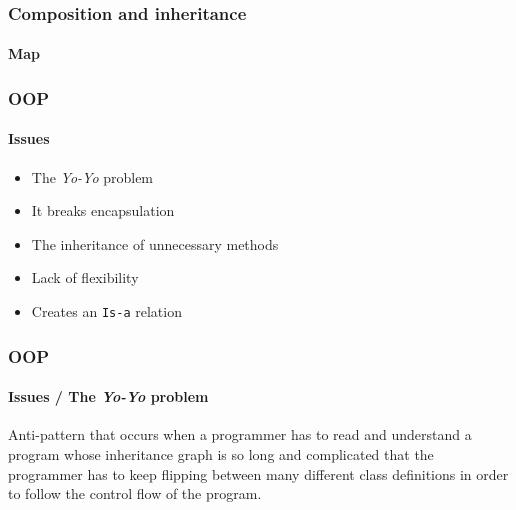 \begin{frame}[fragile,c]
    \frametitle{Composition and inheritance}
    \framesubtitle{Map}

\end{frame}

\begin{frame}
    \frametitle{OOP}
    \framesubtitle{Issues}

    \begin{itemize}[<+->]
        \item The \textit{Yo-Yo} problem
        \item It breaks encapsulation
        \item The inheritance of unnecessary methods
        \item Lack of flexibility
        \item Creates an \texttt{Is-a} relation
    \end{itemize}
\end{frame}

\begin{frame}
    \frametitle{OOP}
    \framesubtitle{Issues / The \textit{Yo-Yo} problem}

    Anti-pattern that occurs when a programmer has to read and understand
    a program whose inheritance graph is so long and complicated that the
    programmer has to keep flipping between many different class definitions
    in order to follow the control flow of the program.
\end{frame}

